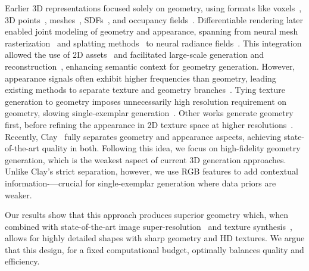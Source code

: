 Earlier 3D representations focused solely on geometry, using formats like voxels~\cite{wu20153d}, 3D points~\cite{qi2017pointnet}, meshes~\cite{hanocka2019meshcnn, maruani_voromesh_2023, maruani_ponq_2024}, SDFs~\cite{park2019deepsdf}, and occupancy fields~\cite{mescheder2019occupancy,Chen_2019_CVPR}.
Differentiable rendering later enabled joint modeling of geometry and appearance, spanning from neural mesh rasterization~\cite{kato2018neural,liu2019soft} and splatting methods~\cite{yifan2019differentiable,wiles2020synsin,kerbl20233d} to neural radiance fields~\cite{lombardi2019neural,mildenhall2021nerf}.
This integration allowed the use of 2D assets~\cite{chan2022efficient,schwarz2020graf} and facilitated large-scale generation and reconstruction~\cite{xu2024dmvd,xu2024grm,wei2024meshlrm,tang2025lgm,hong2024lrm}, enhancing semantic context for geometry generation. However, appearance signals often exhibit higher frequencies than geometry, leading existing methods to separate texture and geometry branches~\cite{mildenhall2021nerf}. Tying texture generation to geometry imposes unnecessarily high resolution requirement on geometry, slowing single-exemplar generation~\cite{wu2024sindm}.
Other works generate geometry first, before refining the appearance in 2D texture space at higher resolutions~\cite{huo2025texgen,yang2024dreammesh,zeng2024paint3d}. Recently, Clay~\cite{zhang2024clay} fully separates geometry and appearance aspects, achieving state-of-the-art quality in both. Following this idea, we focus on high-fidelity geometry generation, which is the weakest aspect of current 3D generation approaches. Unlike Clay’s strict separation, however, we use RGB features to add contextual information-—crucial for single-exemplar generation where data priors are weaker.

Our results show that this approach produces superior geometry which, when combined with state-of-the-art image super-resolution~\cite{kang2023scaling,li2022srdiff} and texture synthesis~\cite{richardson2023texture,Cao_2023_ICCV}, allows for highly detailed shapes with sharp geometry and HD textures. We argue that this design, for a fixed computational budget, optimally balances quality and efficiency.

